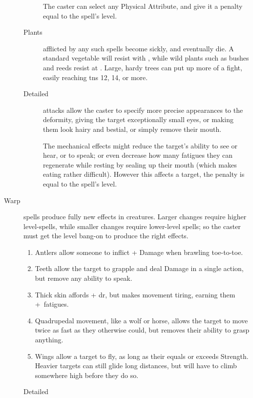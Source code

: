 \begin{multicols}{2}
\begin{description}
\begin{description}
        The caster can select any Physical Attribute, and give it a penalty equal to the spell's level.
      \item[Plants]
        afflicted by any such spells become sickly, and eventually die.
        A standard vegetable will resist with \tn[4], while wild plants such as bushes and reeds resist at \tn[7].
        Large, hardy trees can put up more of a fight, easily reaching \glspl{tn} 12, 14, or more.
      \item[Detailed]
        attacks allow the caster to specify more precise appearances to the deformity, giving the target exceptionally small eyes, or making them look hairy and bestial, or simply remove their mouth.

        The mechanical effects might reduce the target's ability to see or hear, or to speak; or even decrease how many \glspl{fatigue} they can regenerate while resting by sealing up their mouth (which makes eating rather difficult).
        However this affects a target, the penalty is equal to the spell's level.
    \end{description}
  \item[Warp]
    spells produce fully new effects in creatures.
    Larger changes require higher level-spells, while smaller changes require lower-level spells; so the caster must get the level bang-on to produce the right effects.
    \begin{enumerate}
      \item
        Antlers allow someone to inflict + Damage when brawling toe-to-toe.
      \item
        Teeth allow the target to grapple and deal Damage in a single action, but remove any ability to speak.
      \item
        Thick skin affords + \gls{dr}, but makes movement tiring, earning them +~\glspl{fatigue}.
      \item
        Quadrupedal movement, like a wolf or horse, allows the target to move twice as fast as they otherwise could, but removes their ability to grasp anything.
      \item
        Wings allow a target to fly, as long as their  equals or exceeds Strength.
        Heavier targets can still glide long distances, but will have to climb somewhere high before they do so.
    \end{enumerate}
    \begin{description}
      \item[Detailed]

\end{description}
\end{description}
\end{multicols}
